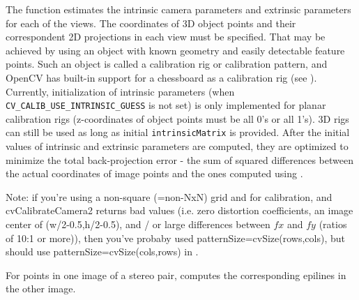 The function estimates the intrinsic camera
parameters and extrinsic parameters for each of the views. The
coordinates of 3D object points and their correspondent 2D projections
in each view must be specified. That may be achieved by using an
object with known geometry and easily detectable feature points.
Such an object is called a calibration rig or calibration pattern,
and OpenCV has built-in support for a chessboard as a calibration
rig (see ). Currently, initialization
of intrinsic parameters (when \texttt{CV\_CALIB\_USE\_INTRINSIC\_GUESS}
is not set) is only implemented for planar calibration rigs
(z-coordinates of object points must be all 0's or all 1's). 3D
rigs can still be used as long as initial \texttt{intrinsicMatrix}
is provided. After the initial values of intrinsic and extrinsic
parameters are computed, they are optimized to minimize the total
back-projection error - the sum of squared differences between the
actual coordinates of image points and the ones computed using
.

Note: if you're using a non-square (=non-NxN) grid and
 for calibration, and cvCalibrateCamera2 returns
bad values (i.e. zero distortion coefficients, an image center of
(w/2-0.5,h/2-0.5), and / or large differences between $fx$ and $fy$ (ratios of
10:1 or more)), then you've probaby  used patternSize=cvSize(rows,cols),
but should use patternSize=cvSize(cols,rows) in .

For points in one image of a stereo pair, computes the corresponding epilines in the other image.


\begin{description}
\end{description}

